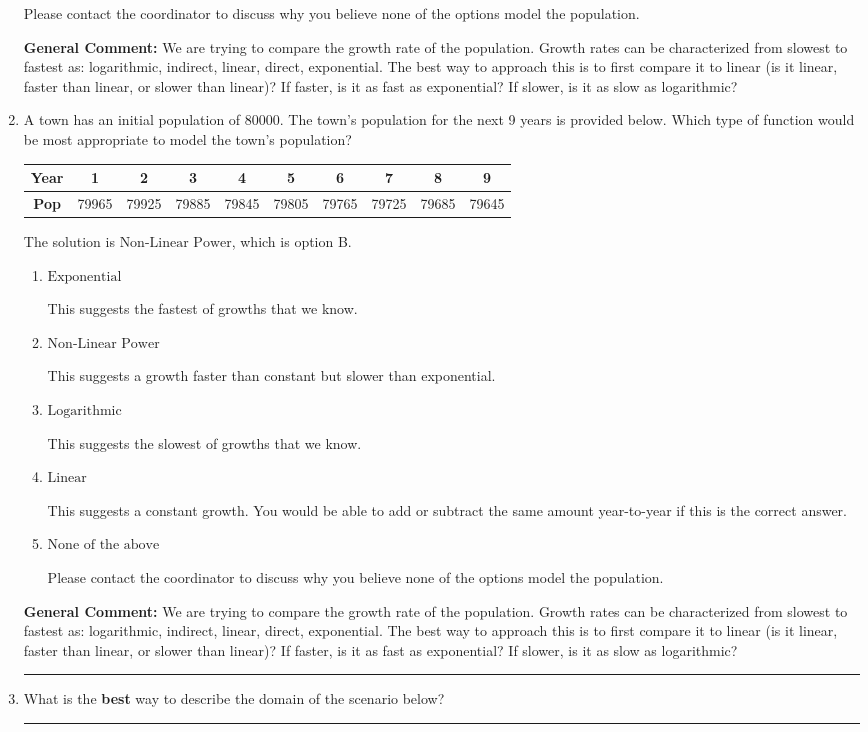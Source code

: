 \documentclass{extbook}[14pt]
\newcommand{\litem}[1]{\item #1

\rule{\textwidth}{0.4pt}}
\begin{document}
\begin{enumerate}
{\begin{enumerate}[label=\Alph*.]
Please contact the coordinator to discuss why you believe none of the options model the population.
\end{enumerate}

\textbf{General Comment:} We are trying to compare the growth rate of the population. Growth rates can be characterized from slowest to fastest as: logarithmic, indirect, linear, direct, exponential. The best way to approach this is to first compare it to linear (is it linear, faster than linear, or slower than linear)? If faster, is it as fast as exponential? If slower, is it as slow as logarithmic?
}
\litem{
A town has an initial population of 80000. The town's population for the next 9 years is provided below. Which type of function would be most appropriate to model the town's population?


\begin{tabular}{c|c|c|c|c|c|c|c|c|c}
\textbf{Year} &1 &2 &3 &4 &5 &6 &7 &8 &9\tabularnewline \hline
\textbf{Pop} &79965 &79925 &79885 &79845 &79805 &79765 &79725 &79685 &79645\end{tabular}The solution is \( \text{Non-Linear Power} \), which is option B.\begin{enumerate}[label=\Alph*.]
\item \( \text{Exponential} \)

This suggests the fastest of growths that we know.
\item \( \text{Non-Linear Power} \)

This suggests a growth faster than constant but slower than exponential.
\item \( \text{Logarithmic} \)

This suggests the slowest of growths that we know.
\item \( \text{Linear} \)

This suggests a constant growth. You would be able to add or subtract the same amount year-to-year if this is the correct answer.
\item \( \text{None of the above} \)

Please contact the coordinator to discuss why you believe none of the options model the population.
\end{enumerate}

\textbf{General Comment:} We are trying to compare the growth rate of the population. Growth rates can be characterized from slowest to fastest as: logarithmic, indirect, linear, direct, exponential. The best way to approach this is to first compare it to linear (is it linear, faster than linear, or slower than linear)? If faster, is it as fast as exponential? If slower, is it as slow as logarithmic?
}
\litem{
What is the \textbf{best} way to describe the domain of the scenario below?

}
\end{enumerate}
\end{document}
